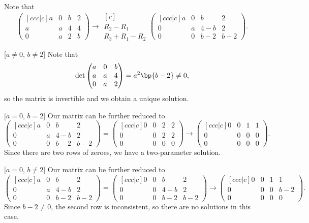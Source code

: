 \begin{solution}
    Note that \[\begin{pmatrix}[ccc|c] a & 0 & b & 2 \\ a & a & 4 & 4 \\ 0 & a & 2 & b\end{pmatrix} \rightarrow \begin{matrix}[r] \\ \scriptstyle R_2 - R_1 \\ \scriptstyle R_3 + R_1 - R_2\end{matrix} \begin{pmatrix}[ccc|c]a & 0 & b & 2 \\ 0 & a & 4-b & 2 \\ 0 & 0 & b-2 & b-2\end{pmatrix}.\]
    
    [$a \neq 0$, $b \neq 2$] Note that \[\det \begin{pmatrix} a & 0 & b \\ a & a & 4 \\ 0 & a & 2 \end{pmatrix} = a^2 \bp{b-2} \neq 0,\] so the matrix is invertible and we obtain a unique solution.

    [$a = 0$, $b = 2$] Our matrix can be further reduced to \[\begin{pmatrix}[ccc|c]a & 0 & b & 2 \\ 0 & a & 4-b & 2 \\ 0 & 0 & b-2 & b-2\end{pmatrix} = \begin{pmatrix}[ccc|c]0 & 0 & 2 & 2 \\ 0 & 0 & 2 & 2 \\ 0 & 0 & 0 & 0\end{pmatrix} \rightarrow \begin{pmatrix}[ccc|c]0 & 0 & 1 & 1 \\ 0 & 0 & 0 & 0 \\ 0 & 0 & 0 & 0\end{pmatrix}.\] Since there are two rows of zeroes, we have a two-parameter solution.

    [$a = 0$, $b \neq 2$] Our matrix can be further reduced to \[\begin{pmatrix}[ccc|c]a & 0 & b & 2 \\ 0 & a & 4-b & 2 \\ 0 & 0 & b-2 & b-2\end{pmatrix} = \begin{pmatrix}[ccc|c]0 & 0 & b & 2 \\ 0 & 0 & 4-b & 2 \\ 0 & 0 & b-2 & b-2\end{pmatrix} \rightarrow \begin{pmatrix}[ccc|c]0 & 0 & 1 & 1 \\ 0 & 0 & 0 & b-2 \\ 0 & 0 & 0 & 0\end{pmatrix}.\] Since $b - 2 \neq 0$, the second row is inconsistent, so there are no solutions in this case.


\end{solution}
